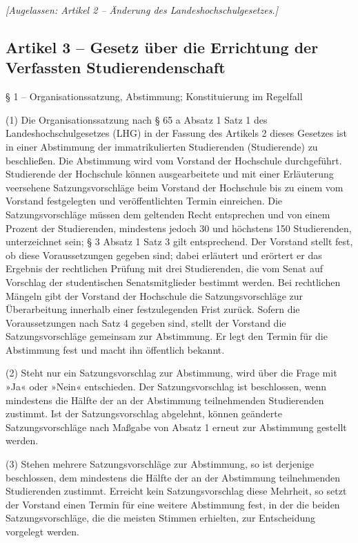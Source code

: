 \documentclass[
10pt,
a4paper,
twoside,								%
titlepage=false,							%
draft=false								%
]{scrartcl}
\begin{document}
\emph{[Augelassen: Artikel 2 – Änderung des Landeshochschulgesetzes.]}


\subsection{Artikel 3 – Gesetz über die Errichtung der Verfassten Studierendenschaft}

§ 1 – Organisationssatzung, Abstimmung; Konstituierung im Regelfall

(1) Die Organisationssatzung nach § 65 a Absatz 1 Satz 1 des Landeshochschulgesetzes (LHG) in der Fassung des Artikels 2 dieses Gesetzes ist in einer Abstimmung der immatrikulierten Studierenden (Studierende) zu beschließen. Die Abstimmung wird vom Vorstand der Hochschule durchgeführt. Studierende der Hochschule können ausgearbeitete und mit einer Erläuterung veersehene Satzungsvorschläge beim Vorstand der Hochschule bis zu einem vom Vorstand festgelegten und veröffentlichten Termin einreichen. Die Satzungsvorschläge müssen dem geltenden Recht entsprechen und von einem Prozent der Studierenden, mindestens jedoch 30 und höchstens 150 Studierenden, unterzeichnet sein; § 3 Absatz 1 Satz 3 gilt entsprechend. Der Vorstand stellt fest, ob diese Voraussetzungen gegeben sind; dabei erläutert und erörtert er das Ergebnis der rechtlichen Prüfung mit drei Studierenden, die vom Senat auf Vorschlag der studentischen Senatsmitglieder bestimmt werden. Bei rechtlichen Mängeln gibt der Vorstand der Hochschule die Satzungsvorschläge zur Überarbeitung innerhalb einer festzulegenden Frist zurück. Sofern die Voraussetzungen nach Satz 4 gegeben sind, stellt der Vorstand die Satzungsvorschläge gemeinsam zur Abstimmung. Er legt den Termin für die Abstimmung fest und macht ihn öffentlich bekannt.

(2) Steht nur ein Satzungsvorschlag zur Abstimmung, wird über die Frage mit »Ja« oder »Nein« entschieden. Der Satzungsvorschlag ist beschlossen, wenn mindestens die Hälfte der an der Abstimmung teilnehmenden Studierenden zustimmt. Ist der Satzungsvorschlag abgelehnt, können geänderte Satzungsvorschläge nach Maßgabe von Absatz 1 erneut zur Abstimmung gestellt werden.

(3) Stehen mehrere Satzungsvorschläge zur Abstimmung, so ist derjenige beschlossen, dem mindestens die Hälfte der an der Abstimmung teilnehmenden Studierenden zustimmt. Erreicht kein Satzungsvorschlag diese Mehrheit, so setzt der Vorstand einen Termin für eine weitere Abstimmung fest, in der die beiden Satzungsvorschläge, die die meisten Stimmen erhielten, zur Entscheidung vorgelegt werden.
\end{document}
